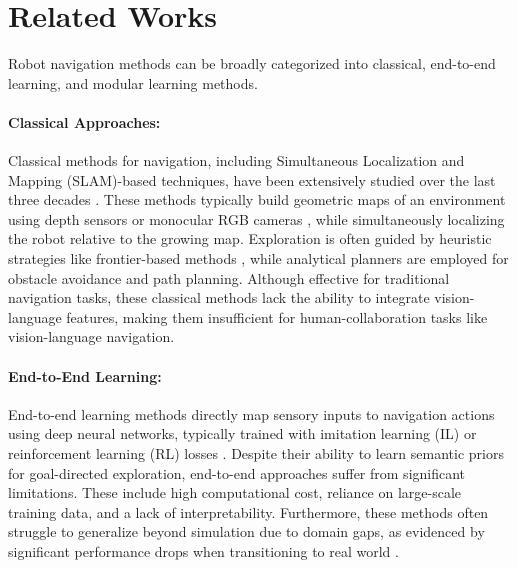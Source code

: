 \section{Related Works}
\label{sec:related}

Robot navigation methods can be broadly categorized into classical, end-to-end learning, and modular learning methods.

\paragraph{Classical Approaches:}
Classical methods for navigation, including Simultaneous Localization and Mapping (SLAM)-based techniques, have been extensively studied over the last three decades \cite{elfes1989using,fennema1990experiments,thrun1999minerva,yamauchi1997frontier}. 
These methods typically build geometric maps of an environment using depth sensors or monocular RGB cameras \cite{thrun2001robust,newcombe2011kinectfusion,davison2007monoslam,sattler2018benchmarking}, while simultaneously localizing the robot relative to the growing map. 
Exploration is often guided by heuristic strategies like frontier-based methods \cite{yamauchi1997frontier,freda2005frontier}, while analytical planners are employed for obstacle avoidance and path planning. 
Although effective for traditional navigation tasks, these classical methods lack the ability to integrate vision-language features, making them insufficient for human-collaboration tasks like vision-language navigation.

\paragraph{End-to-End Learning:}
End-to-end learning methods directly map sensory inputs to navigation actions using deep neural networks, typically trained with imitation learning (IL) or reinforcement learning (RL) losses \cite{mirowski2016learning,savva2017minos,codevilla2018end,singh2023scene,ramrakhya2022habitat}. 
Despite their ability to learn semantic priors for goal-directed exploration, end-to-end approaches suffer from significant limitations. 
These include high computational cost, reliance on large-scale training data, and a lack of interpretability. 
Furthermore, these methods often struggle to generalize beyond simulation due to domain gaps, as evidenced by significant performance drops when transitioning to real world \cite{gervet2023navigating}.

